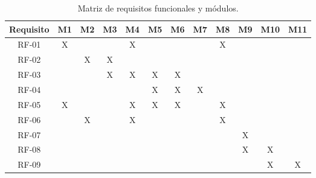 \begin{table}[H]
    \centering
    \scriptsize
    \setlength{\tabcolsep}{3.5pt}
    \renewcommand{\arraystretch}{1.2}
    \caption{Matriz de requisitos funcionales y módulos.}
    \label{tab:matriz_requisitos_modulos}

    \begin{tabular}{c|ccccccccccc}
        \toprule
        \textbf{Requisito}
        & \textbf{M1} & \textbf{M2} & \textbf{M3} & \textbf{M4}
        & \textbf{M5} & \textbf{M6} & \textbf{M7} & \textbf{M8}
        & \textbf{M9} & \textbf{M10} & \textbf{M11} \\
        \midrule

        RF-01 & X &   &   & X &   &   &   & X &   &   &   \\
        RF-02 &   & X & X &   &   &   &   &   &   &   &   \\
        RF-03 &   &   & X & X & X & X &   &   &   &   &   \\
        RF-04 &   &   &   &   & X & X & X &   &   &   &   \\
        RF-05 & X &   &   & X & X & X &   & X &   &   &   \\
        RF-06 &   & X &   & X &   &   &   & X &   &   &   \\
        RF-07 &   &   &   &   &   &   &   &   & X &   &   \\
        RF-08 &   &   &   &   &   &   &   &   & X & X &   \\
        RF-09 &   &   &   &   &   &   &   &   &   & X & X \\

        \bottomrule
    \end{tabular}
\end{table}
